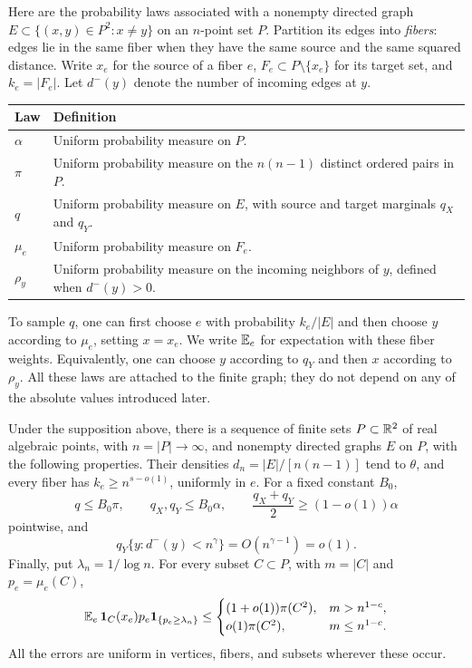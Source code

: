 Here are the probability laws associated with a nonempty directed graph
$E\subset\{(x,y)\in P^2:x\ne y\}$ on an $n$-point set $P$. Partition
its edges into \emph{fibers}: edges lie in the same fiber when they have
the same source and the same squared distance. Write $x_e$ for the
source of a fiber $e$, $F_e\subset P\setminus\{x_e\}$ for its target
set, and $k_e=|F_e|$. Let $d^-(y)$ denote the number of incoming edges at
$y$.
\begin{center}
\renewcommand{\arraystretch}{1.2}
\begin{tabular}{@{}p{}p{}@{}}
\hline
Law & Definition \\
\hline
$\alpha$ & Uniform probability measure on $P$. \\
$\pi$ & Uniform probability measure on the $n(n-1)$ distinct ordered
  pairs in $P$. \\
$q$ & Uniform probability measure on $E$, with source and target
  marginals $q_X$ and $q_Y$. \\
$\mu_e$ & Uniform probability measure on $F_e$. \\
$\rho_y$ & Uniform probability measure on the incoming neighbors of
  $y$, defined when $d^-(y)>0$. \\
\hline
\end{tabular}
\end{center}
To sample $q$, one can first choose $e$ with probability $k_e/|E|$ and
then choose $y$ according to $\mu_e$, setting $x=x_e$. We write
$\mathbb E_e$ for expectation with these fiber weights. Equivalently, one can
choose $y$ according to $q_Y$ and then $x$ according to $\rho_y$.
All these laws are attached to the finite graph; they do not depend on
any of the absolute values introduced later.

\begin{proposition}\label{prop:graph}
Under the supposition above, there is a sequence of finite sets
$P\subset\mathbb R^2$ of real algebraic points, with $n=|P|\to\infty$, and
nonempty directed graphs $E$ on $P$, with the following properties.
Their densities $d_n=|E|/[n(n-1)]$ tend to $\theta$, and every fiber has
$k_e\ge n^{s-o(1)}$, uniformly in $e$. For a fixed constant $B_0$,
\begin{equation}\label{eq:ext-domination}
  q\le B_0\pi,\qquad q_X,q_Y\le B_0\alpha,\qquad
  \frac{q_X+q_Y}{2}\ge(1-o(1))\alpha
\end{equation}
pointwise, and
\begin{equation}\label{eq:ext-small-degree}
  q_Y\{y:d^-(y)<n^\gamma\}=O(n^{\gamma-1})=o(1).
\end{equation}
Finally, put $\lambda_n=1/\log n$. For every subset $C\subset P$, with
$m=|C|$ and $p_e=\mu_e(C)$,
\begin{equation}\label{eq:subset}
 \mathbb E_e\,\mathbf 1_C(x_e)p_e\mathbf 1_{\{p_e\ge\lambda_n\}}
 \le
 \begin{cases}
   (1+o(1))\pi(C^2),&m>n^{1-c},\\
   o(1)\pi(C^2),&m\le n^{1-c}.
 \end{cases}
\end{equation}
All the errors are uniform in vertices, fibers, and subsets wherever
these occur.
\end{proposition}

